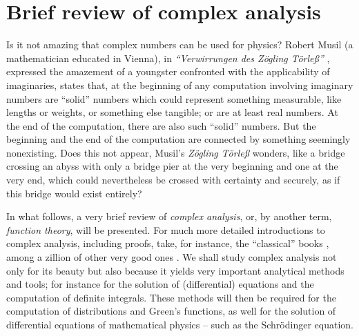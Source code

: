 \chapter{Brief review of complex analysis}
\label{2011-m-ch-ca}

Is it not amazing that complex numbers \cite[-40mm]{Hlawka-zz} can be used for physics?
Robert Musil (a mathematician educated in Vienna), in  {\it ``Verwirrungen des Z\"ogling T\"orle\ss''}
,
expressed the amazement of a youngster confronted with the applicability of imaginaries,
states that, at the beginning of any computation involving imaginary numbers
are ``solid'' numbers which could represent something measurable, like lengths or weights,
or something else tangible; or are at least real numbers.
At the end of the computation, there are also such ``solid'' numbers.
But the beginning and the end of the computation are connected by something
seemingly nonexisting.
Does this not appear, Musil's {\it  Z\"ogling T\"orle\ss} wonders,
like a bridge crossing an abyss
with only a bridge pier at the very beginning and one at the very end,
which could nevertheless be crossed with certainty and securely,
as if this bridge would exist entirely?


In what follows, a very brief review of
{\em complex analysis},
or, by another term,
{\em function theory},
will be presented.
For much more detailed introductions to complex analysis,
including proofs,
take, for instance, the ``classical'' books
\cite[-25mm]{freitag-busam,whittaker:1927:cma,Greene,Hille62,ahlfors:1966:ca},
among a zillion of other very good ones \cite{jaenich-ft,salamon-ft}.
We shall study complex analysis not only for its beauty but also because it yields
very important analytical methods and tools;
for instance for the solution of (differential) equations and the
computation of definite integrals.
These methods will then be required for the computation of distributions and Green's functions,
as well for the solution of differential equations of mathematical physics -- such as the Schr\"odinger equation.

